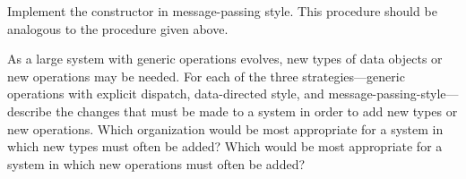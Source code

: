 \begin{exercise}
	\label{Exercise 2.75}
	Implement the constructor  in message-passing style.
	This procedure should be analogous to the  procedure given above.
\end{exercise}



\begin{exercise}
	\label{Exercise 2.76}
	As a large system with generic operations evolves, new types of data objects or new operations may be needed.
	For each of the three strategies---generic operations with explicit dispatch, data-directed style, and message-passing-style---describe the changes that must be made to a system in order to add new types or new operations.
	Which organization would be most appropriate for a system in which new types must often be added?
	Which would be most appropriate for a system in which new operations must often be added?
\end{exercise}
